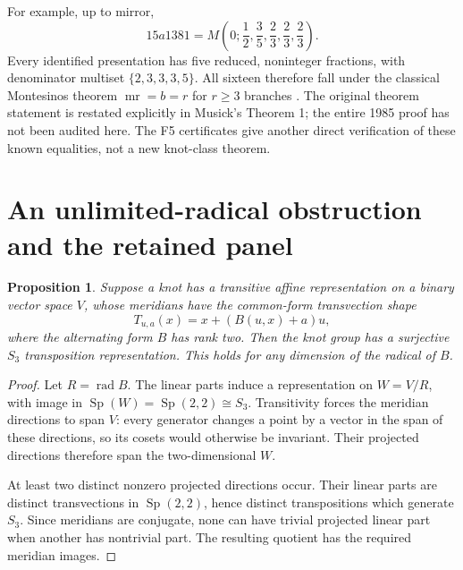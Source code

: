 \documentclass[11pt]{article}
\newtheorem{proposition}[theorem]{Proposition}
\newcommand{\mr}{\operatorname{mr}}
\begin{document}
For example, up to mirror,
\[
 15a1381=M\left(0;\frac12,\frac35,\frac23,\frac23,\frac23\right).
\]
Every identified presentation has five reduced, noninteger fractions,
with denominator multiset $\{2,3,3,3,5\}$. All sixteen therefore fall
under the classical Montesinos theorem $\mr=b=r$ for $r\ge3$ branches
\cite{bz,musick}. The original theorem statement is restated explicitly
in Musick's Theorem 1; the entire 1985 proof has not been audited here.
The F5 certificates give another direct verification of these known
equalities, not a new knot-class theorem.

\section{An unlimited-radical obstruction and the retained panel}

\begin{proposition}\label{prop:radical}
Suppose a knot has a transitive affine representation on a binary vector
space $V$, whose meridians have the common-form transvection shape
\[
 T_{u,a}(x)=x+(B(u,x)+a)u,
\]
where the alternating form $B$ has rank two. Then the knot group has a
surjective $S_3$ transposition representation. This holds for any
dimension of the radical of $B$.
\end{proposition}
\begin{proof}
Let $R=\operatorname{rad}B$. The linear parts induce a representation
on $W=V/R$, with image in $\operatorname{Sp}(W)=\operatorname{Sp}(2,2)
\cong S_3$. Transitivity forces the meridian directions to span $V$:
every generator changes a point by a vector in the span of these
directions, so its cosets would otherwise be invariant. Their projected
directions therefore span the two-dimensional $W$.

At least two distinct nonzero projected directions occur. Their linear
parts are distinct transvections in $\operatorname{Sp}(2,2)$, hence
distinct transpositions which generate $S_3$. Since meridians are
conjugate, none can have trivial projected linear part when another
has nontrivial part. The resulting quotient has the required meridian
images.
\end{proof}
\end{document}
